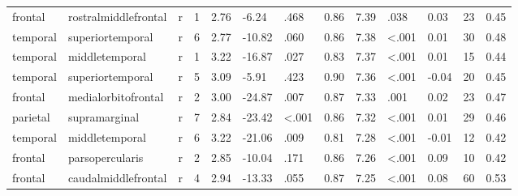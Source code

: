 \documentclass{article}
\begin{document}
\begin{longtable}{llrR{1.3cm}R{1cm}R{1.3cm}R{1cm}R{1cm}R{1.3cm}R{1cm}R{1.8cm}R{1.3cm}R{1.8cm}}
   frontal &      rostralmiddlefrontal &    r &         1 &                  2.76 &            -6.24 &               .468 &                               0.86 &                          7.39 &                            .038 &   0.03 &     23 &      0.45 \\
  temporal &          superiortemporal &    r &         6 &                  2.77 &           -10.82 &               .060 &                               0.86 &                          7.38 &                   \textless.001 &   0.01 &     30 &      0.48 \\
  temporal &            middletemporal &    r &         1 &                  3.22 &           -16.87 &               .027 &                               0.83 &                          7.37 &                   \textless.001 &   0.01 &     15 &      0.44 \\
  temporal &          superiortemporal &    r &         5 &                  3.09 &            -5.91 &               .423 &                               0.90 &                          7.36 &                   \textless.001 &  -0.04 &     20 &      0.45 \\
   frontal &       medialorbitofrontal &    r &         2 &                  3.00 &           -24.87 &               .007 &                               0.87 &                          7.33 &                            .001 &   0.02 &     23 &      0.47 \\
  parietal &             supramarginal &    r &         7 &                  2.84 &           -23.42 &      \textless.001 &                               0.86 &                          7.32 &                   \textless.001 &   0.01 &     29 &      0.46 \\
  temporal &            middletemporal &    r &         6 &                  3.22 &           -21.06 &               .009 &                               0.81 &                          7.28 &                   \textless.001 &  -0.01 &     12 &      0.42 \\
   frontal &           parsopercularis &    r &         2 &                  2.85 &           -10.04 &               .171 &                               0.86 &                          7.26 &                   \textless.001 &   0.09 &     10 &      0.42 \\
   frontal &       caudalmiddlefrontal &    r &         4 &                  2.94 &           -13.33 &               .055 &                               0.87 &                          7.25 &                   \textless.001 &   0.08 &     60 &      0.53 \\

\end{longtable}
\end{document}
